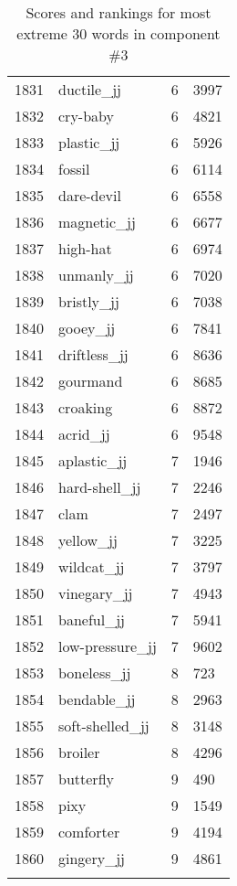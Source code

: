 \begin{longtable}[!htbp]{| rlr@{.}l |}
    1831 & ductile\_jj & 6 & 3997 \\
    1832 & cry-baby & 6 & 4821 \\
    1833 & plastic\_jj & 6 & 5926 \\
    1834 & fossil & 6 & 6114 \\
    1835 & dare-devil & 6 & 6558 \\
    1836 & magnetic\_jj & 6 & 6677 \\
    1837 & high-hat & 6 & 6974 \\
    1838 & unmanly\_jj & 6 & 7020 \\
    1839 & bristly\_jj & 6 & 7038 \\
    1840 & gooey\_jj & 6 & 7841 \\
    1841 & driftless\_jj & 6 & 8636 \\
    1842 & gourmand & 6 & 8685 \\
    1843 & croaking & 6 & 8872 \\
    1844 & acrid\_jj & 6 & 9548 \\
    1845 & aplastic\_jj & 7 & 1946 \\
    1846 & hard-shell\_jj & 7 & 2246 \\
    1847 & clam & 7 & 2497 \\
    1848 & yellow\_jj & 7 & 3225 \\
    1849 & wildcat\_jj & 7 & 3797 \\
    1850 & vinegary\_jj & 7 & 4943 \\
    1851 & baneful\_jj & 7 & 5941 \\
    1852 & low-pressure\_jj & 7 & 9602 \\
    1853 & boneless\_jj & 8 & 723 \\
    1854 & bendable\_jj & 8 & 2963 \\
    1855 & soft-shelled\_jj & 8 & 3148 \\
    1856 & broiler & 8 & 4296 \\
    1857 & butterfly & 9 & 490 \\
    1858 & pixy & 9 & 1549 \\
    1859 & comforter & 9 & 4194 \\
    1860 & gingery\_jj & 9 & 4861 \\
    \hline
    \caption{Scores and rankings for most extreme 30 words in component \#3} \\
\end{longtable}
